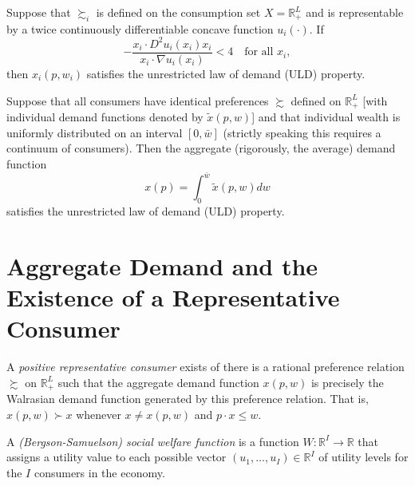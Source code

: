 \begin{prop}
    Suppose that $\succsim_i$ is defined on the consumption set $X = \mathbb{R}^L_+$ and is representable by a twice continuously differentiable concave function $u_i(\cdot)$. If 
    \begin{equation*}
        - \frac{x_i \cdot D^2 u_i(x_i) x_i}{x_i \cdot \nabla u_i(x_i)} < 4 \quad \text{for all } x_i,
    \end{equation*}
    then $x_i(p, w_i)$ satisfies the unrestricted law of demand (ULD) property.
\end{prop}

\begin{prop}
    Suppose that all consumers have identical preferences $\succsim$ defined on $\mathbb{R}^{L}_+$ [with individual demand functions denoted by $\tilde{x}(p, w)$] and that individual wealth is uniformly distributed on an interval $[0, \bar{w}]$ (strictly speaking this requires a continuum of consumers). Then the aggregate (rigorously, the average) demand function
    \begin{equation*}
        x(p) = \int_0^{\bar{w}} \tilde{x}(p, w) dw
    \end{equation*}
    satisfies the unrestricted law of demand (ULD) property.
\end{prop}


\section{Aggregate Demand and the Existence of a Representative Consumer}

\begin{defn}
    A \emph{positive representative consumer} exists of there is a rational preference relation $\succsim$ on $\mathbb{R}^{L}_+$ such that the aggregate demand function $x(p, w)$ is precisely the Walrasian demand function generated by this preference relation. That is, $x(p, w) \succ x$ whenever $x \neq x(p, w)$ and $p \cdot x \leq w$.
\end{defn}

\begin{defn}
    A \emph{(Bergson-Samuelson) social welfare function} is a function $W: \mathbb{R}^{I} \to \mathbb{R}$ that assigns a utility value to each possible vector $(u_1, \dots, u_I) \in \mathbb{R}^{I}$ of utility levels for the $I$ consumers in the economy.
\end{defn}

